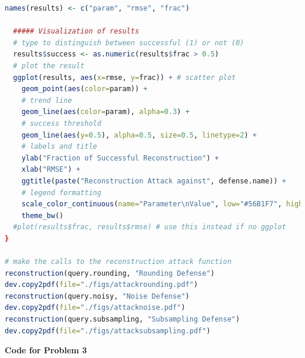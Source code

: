 \documentclass[12pt]{article}
\begin{document}
\begin{lstlisting}[language=R]
  names(results) <- c("param", "rmse", "frac")
  
  ##### Visualization of results
  # type to distinguish between successful (1) or not (0)
  results$success <- as.numeric(results$frac > 0.5)
  # plot the result
  ggplot(results, aes(x=rmse, y=frac)) + # scatter plot
    geom_point(aes(color=param)) + 
    # trend line
    geom_line(aes(color=param), alpha=0.3) +
    # success threshold
    geom_line(aes(y=0.5), alpha=0.5, size=0.5, linetype=2) +
    # labels and title
    ylab("Fraction of Successful Reconstruction") +
    xlab("RMSE") +
    ggtitle(paste("Reconstruction Attack against", defense.name)) + 
    # legend formatting
    scale_color_continuous(name="Parameter\nValue", low="#56B1F7", high="#132B43") +
    theme_bw()
  #plot(results$frac, results$rmse) # use this instead if no ggplot
}

# make the calls to the reconstruction attack function
reconstruction(query.rounding, "Rounding Defense")
dev.copy2pdf(file="./figs/attackrounding.pdf")
reconstruction(query.noisy, "Noise Defense")
dev.copy2pdf(file="./figs/attacknoise.pdf")
reconstruction(query.subsampling, "Subsampling Defense")
dev.copy2pdf(file="./figs/attacksubsampling.pdf")
\end{lstlisting}


\pagebreak

\textbf{Code for Problem 3}
\end{document}
